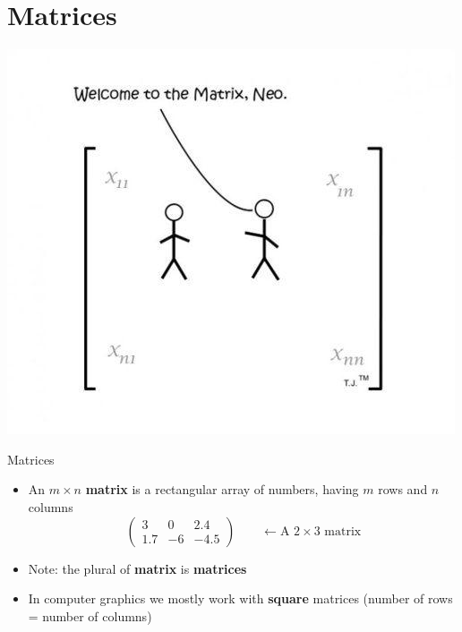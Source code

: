 \part{Matrices}
\frame{\partpage}

\begin{frame}
	\begin{center}
		\includegraphics[height=0.8\textheight]{matrixjoke}
	\end{center}
\end{frame}

\begin{frame}{Matrices}
	\begin{itemize}
		\pause\item An $m \times n$ \textbf{matrix} is a rectangular array of numbers, having $m$ rows and $n$ columns
		\pause $$
			\begin{pmatrix}
				3 & 0 & 2.4 \\
				1.7 & -6 & -4.5
			\end{pmatrix}
			\qquad \leftarrow \text{A $2 \times 3$ matrix}
		$$
		\pause\item Note: the plural of \textbf{matrix} is \textbf{matrices}
		\pause\item In computer graphics we mostly work with \textbf{square} matrices (number of rows = number of columns)
	\end{itemize}
\end{frame}

